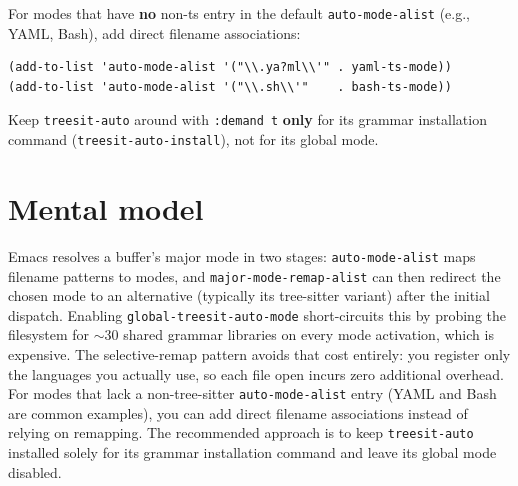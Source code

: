For modes that have \textbf{no} non-ts entry in the default \texttt{auto-mode-alist} (e.g., YAML, Bash), add direct filename associations:

\begin{verbatim}
(add-to-list 'auto-mode-alist '("\\.ya?ml\\'" . yaml-ts-mode))
(add-to-list 'auto-mode-alist '("\\.sh\\'"    . bash-ts-mode))
\end{verbatim}

Keep \texttt{treesit-auto} around with \texttt{:demand t} \textbf{only} for its grammar installation command (\texttt{treesit-auto-install}), not for its global mode.

\section{Mental model}
Emacs resolves a buffer's major mode in two stages:
\texttt{auto-mode-alist} maps filename patterns to modes, and
\texttt{major-mode-remap-alist} can then redirect the chosen mode to an
alternative (typically its tree-sitter variant) after the initial
dispatch.  Enabling \texttt{global-treesit-auto-mode} short-circuits
this by probing the filesystem for \(\sim\)30 shared grammar libraries
on every mode activation, which is expensive.  The selective-remap
pattern avoids that cost entirely: you register only the languages you
actually use, so each file open incurs zero additional overhead.  For
modes that lack a non-tree-sitter \texttt{auto-mode-alist} entry (YAML
and Bash are common examples), you can add direct filename associations
instead of relying on remapping.  The recommended approach is to keep
\texttt{treesit-auto} installed solely for its grammar installation
command and leave its global mode disabled.
